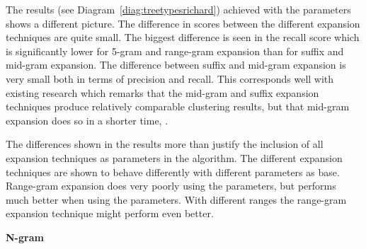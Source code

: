 
The results (see Diagram~\ref{diag:treetypesrichard}) achieved with the \citeauthor{Moe2014compact} parameters shows a different picture. The difference in scores between the different expansion techniques are quite small. The biggest difference is seen in the recall score which is significantly lower for 5-gram and range-gram expansion than for suffix and mid-gram expansion. The difference between suffix and mid-gram expansion is very small both in terms of precision and recall. This corresponds well with existing research which remarks that the mid-gram and suffix expansion techniques produce relatively comparable clustering results, but that mid-gram expansion does so in a shorter time, \parencite{Moe2014compact}.

The differences shown in the results more than justify the inclusion of all expansion techniques as parameters in the algorithm. The different expansion techniques are shown to behave differently with different parameters as base. Range-gram expansion does very poorly using the \citeauthor{Oren1998} parameters, but performs much better when using the \citeauthor{Moe2014compact} parameters. With different ranges the range-gram expansion technique might perform even better.

\textbf{N-gram}

